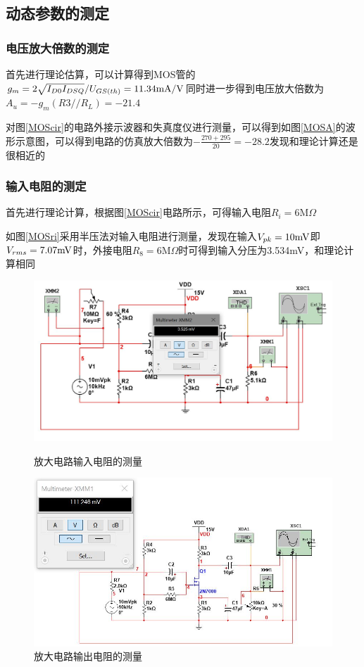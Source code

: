 \documentclass[UTF8,a4paper]{ctexart}
\begin{document}
\subsection{动态参数的测定}
\subsubsection{电压放大倍数的测定}
首先进行理论估算，可以计算得到MOS管的$g_m=2\sqrt{I_{D0}I_{DSQ}}/U_{GS(th)}=11.34\rm{mA/V}$同时进一步得到电压放大倍数为$A_u=-g_m(R3//R_L)=-21.4$

对图\ref{MOScir}的电路外接示波器和失真度仪进行测量，可以得到如图\ref{MOSA}的波形示意图，可以得到电路的仿真放大倍数为$-\frac{270+295}{20}=-28.2$发现和理论计算还是很相近的
\subsubsection{输入电阻的测定}
首先进行理论计算，根据图\ref{MOScir}电路所示，可得输入电阻$R_i=6\mathrm{M}\Omega$

如图\ref{MOSri}采用半压法对输入电阻进行测量，发现在输入$V_{pk}=10\rm{mV}$即$V_{rms}=7.07\rm{mV}$时，外接电阻$R_8=6\mathrm{M}\Omega$时可得到输入分压为3.534mV，和理论计算相同
\begin{figure}
\centering
\includegraphics[width=\textwidth]{2-4Ri.jpg}
\caption{放大电路输入电阻的测量}
\label{MOSri}
\includegraphics[width=\textwidth]{2-4Ro.jpg}
\caption{放大电路输出电阻的测量}
\label{MOSro}
\end{figure}
\end{document}
